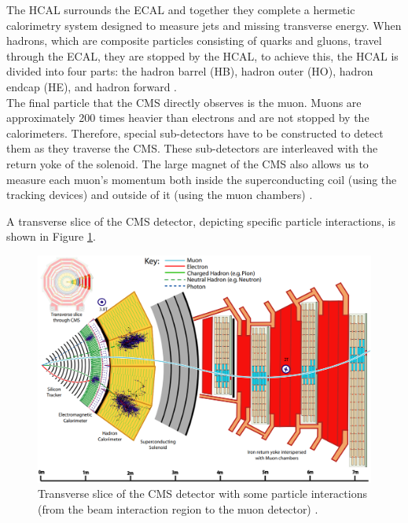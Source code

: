 The HCAL surrounds the ECAL and together they complete a hermetic calorimetry system designed to measure jets and missing transverse energy. When hadrons, which are composite particles consisting of quarks and gluons, travel through the ECAL, they are stopped by the HCAL, to achieve  this, the HCAL is divided into four parts: the hadron barrel (HB), hadron outer (HO), hadron endcap (HE), and hadron forward \cite{det_summary}.\\

The final particle that the CMS directly observes is the muon. Muons are approximately 200 times heavier than electrons and are not stopped by the calorimeters. Therefore, special sub-detectors have to be constructed to detect them as they traverse the CMS. These sub-detectors are interleaved with the return yoke of the solenoid. The large magnet of the CMS also allows us to measure each muon's momentum both inside the superconducting coil (using the tracking devices) and outside of it (using the muon chambers) \cite{det_summary}. 

A transverse slice of the CMS detector, depicting specific particle interactions, is shown in Figure \ref{slice_CMS}.


\begin{center}
  \begin{figure}[ht]
    \centering
    \includegraphics[scale=.3]{Chapter2/slice_det.png}
    \caption[Transverse slice fo CMS detector]{Transverse slice of the CMS detector with some particle interactions (from the beam interaction region to the muon detector) \cite{det_summary}.}
    \label{slice_CMS}
  \end{figure}
\end{center}


